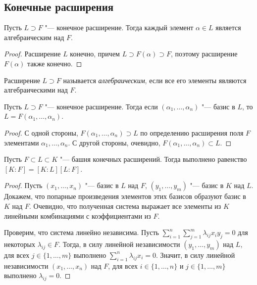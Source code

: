 \subsection{Конечные расширения}

\begin{proposition}
	Пусть $L \supset F$ "--- конечное расширение. Тогда каждый элемент $\alpha \in L$ является алгебраическим над $F$.
\end{proposition}

\begin{proof}
	Расширение $L$ конечно, причем $L \supset F(\alpha) \supset F$, поэтому расширение $F(\alpha)$ также конечно.
\end{proof}

\begin{definition}
	Расширение $L \supset F$ называется \textit{алгебраическим}, если все его элементы являются алгебраическими над $F$.
\end{definition}

\begin{proposition}
	Пусть $L \supset F$ "--- конечное расширение. Тогда если $(\alpha_1, \dotsc, \alpha_n)$ "--- базис в $L$, то $L = F(\alpha_1, \dotsc, \alpha_n)$.
\end{proposition}

\begin{proof}
	С одной стороны, $F(\alpha_1, \dotsc, \alpha_n) \supset L$ по определению расширения поля $F$ элементами $\alpha_1, \dotsc, \alpha_n$. С другой стороны, очевидно, $F(\alpha_1, \dotsc, \alpha_n) \subset L$.
\end{proof}

\begin{proposition}
	Пусть $F \subset L \subset K$ "--- башня конечных расширений. Тогда выполнено равенство $[K : F] = [K : L][L : F]$.
\end{proposition}

\begin{proof}
	Пусть $(x_1, \dotsc, x_n)$ "--- базис в $L$ над $F$, $(y_1, \dotsc, y_m)$ "--- базис в $K$ над $L$. Докажем, что попарные произведения элементов этих базисов образуют базис в $K$ над $F$. Очевидно, что полученная система выражает все элементы из $K$ линейными комбинациями с коэффициентами из $F$.
	
	Проверим, что система линейно независима. Пусть $\sum_{i = 1}^n\sum_{j = 1}^m \lambda_{ij}x_iy_j = 0$ для некоторых $\lambda_{ij} \in F$. Тогда, в силу линейной независимости $(y_1, \dotsc, y_m)$ над $L$, для всех $j \in \{1, \dotsc, m\}$ выполнено $\sum_{i = 1}^n\lambda_{ij}x_i = 0$. Значит, в силу линейной независимости $(x_1, \dotsc, x_n)$ над $F$, для всех $i \in \{1, \dotsc, n\}$ и $j \in \{1, \dotsc, m\}$ выполнено $\lambda_{ij} = 0$.
\end{proof}

